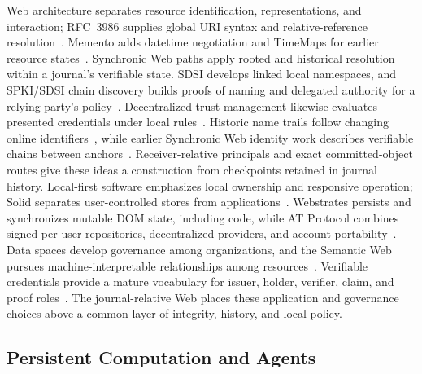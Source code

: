 Web architecture separates resource identification, representations, and interaction; RFC~3986 supplies global URI syntax and relative-reference resolution~\cite{Jacobs2004webarch,BernersLee2005uri}. Memento adds datetime negotiation and TimeMaps for earlier resource states~\cite{VanDeSompel2013memento}. Synchronic Web paths apply rooted and historical resolution within a journal's verifiable state. SDSI develops linked local namespaces, and SPKI/SDSI chain discovery builds proofs of naming and delegated authority for a relying party's policy~\cite{Rivest1996sdsi,Clarke2001chain}. Decentralized trust management likewise evaluates presented credentials under local rules~\cite{Blaze1996trust}. Historic name trails follow changing online identifiers~\cite{Maniatis2003hints}, while earlier Synchronic Web identity work describes verifiable chains between anchors~\cite{dinh2025identity}. Receiver-relative principals and exact committed-object routes give these ideas a construction from checkpoints retained in journal history. Local-first software emphasizes local ownership and responsive operation; Solid separates user-controlled stores from applications~\cite{Kleppmann2019local,Mansour2016solid}. Webstrates persists and synchronizes mutable DOM state, including code, while AT Protocol combines signed per-user repositories, decentralized providers, and account portability~\cite{Klokmose2015webstrates,Kleppmann2024bluesky}. Data spaces develop governance among organizations, and the Semantic Web pursues machine-interpretable relationships among resources~\cite{Otto2019designing,BernersLee2001semantic}. Verifiable credentials provide a mature vocabulary for issuer, holder, verifier, claim, and proof roles~\cite{Sedlmeir2021digital}. The journal-relative Web places these application and governance choices above a common layer of integrity, history, and local policy.

\subsection{Persistent Computation and Agents}

